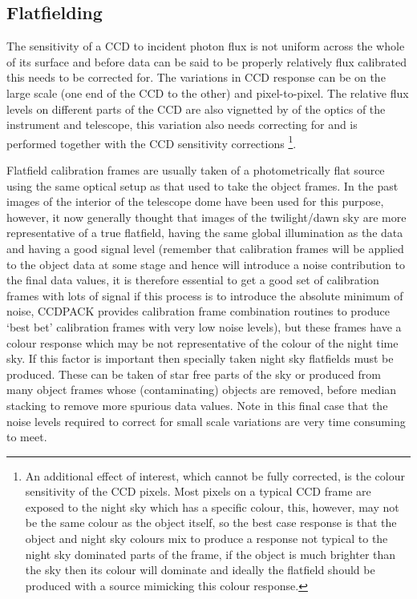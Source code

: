 \documentclass[twoside,11pt]{article}
\newcommand{\xlabel}[1]{}
\renewcommand{\_}{\texttt{\symbol{95}}}
\begin{document}
\subsection{Flatfielding\xlabel{CCDglosflatfielding}}
The sensitivity of a CCD to incident photon flux is not uniform across
the whole of its surface and before data can be said to be properly
relatively flux calibrated this needs to be corrected for. The
variations in CCD response can be on the large scale (one end of the CCD
to the other) and pixel-to-pixel. The relative flux levels on different
parts of the CCD are also vignetted by of the optics of the instrument
and telescope, this variation also needs correcting for and is performed
together with the CCD sensitivity corrections \footnote {An additional
effect of interest, which cannot be fully corrected, is the colour
sensitivity of the CCD pixels. Most pixels on a typical CCD frame are
exposed to the night sky which has a specific colour, this, however, may
not be the same colour as the object itself, so the best case response
is that the object and night sky colours mix to produce a response not
typical to the night sky dominated parts of the frame, if the object is
much brighter than the sky then its colour will dominate and ideally the
flatfield should be produced with a source mimicking this colour
response.}.

Flatfield calibration frames are usually taken of a photometrically flat
source using the same optical setup as that used to take the object
frames. In the past images of the interior of the telescope dome have
been used for this purpose, however, it now generally thought that
images of the twilight/dawn sky are more representative of a true
flatfield, having the same global illumination as the data and having a
good signal level (remember that calibration frames will be applied to
the object data at some stage and hence will introduce a noise
contribution to the final data values, it is therefore essential to get
a good set of calibration frames with lots of signal if this process is
to introduce the absolute minimum of noise, CCDPACK provides calibration
frame combination routines to produce `best bet' calibration frames with
very low noise levels), but these frames have a colour response which
may be not representative of the colour of the night time sky. If this
factor is important then specially taken night sky flatfields must be
produced. These can be taken of star free parts of the sky or produced
from many object frames whose (contaminating) objects are removed,
before median stacking to remove more spurious data values. Note in this
final case that the noise levels required to correct for small scale
variations are very time consuming to meet.
\end{document}
